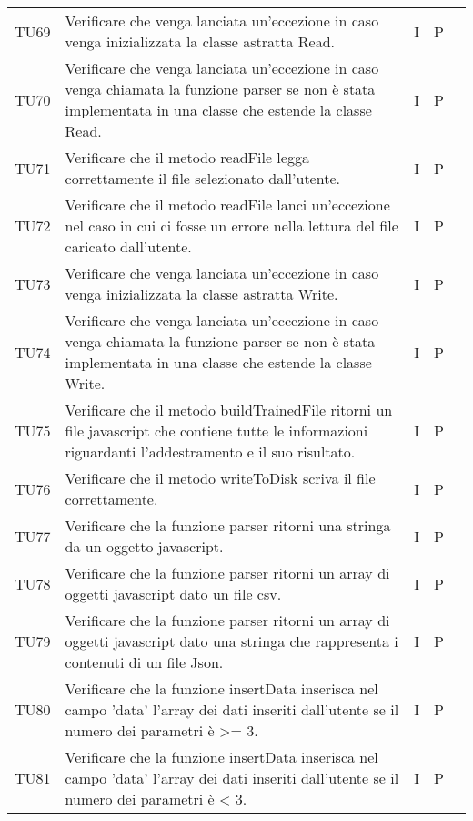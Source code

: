 \begin{longtable} {
		>{}p{15mm} 
		>{}p{79.5mm}
		>{}p{15mm} 
		>{}p{15mm}
		>{}p{0mm}}
	TU69		& Verificare che venga lanciata un'eccezione in caso venga inizializzata la classe astratta  Read.& I & P &\TBstrut \\ [2mm]
	TU70		& Verificare che venga lanciata un'eccezione in caso venga chiamata la funzione parser se non è stata implementata in una classe che estende la classe Read.& I & P &\TBstrut \\ [2mm]
	TU71		& Verificare che il metodo readFile legga correttamente il file selezionato dall'utente.& I & P &\TBstrut \\ [2mm]
	TU72		& Verificare che il metodo readFile lanci un'eccezione nel caso in cui ci fosse un errore nella lettura del file caricato dall'utente.& I & P &\TBstrut \\ [2mm]
	TU73		& Verificare che venga lanciata un'eccezione in caso venga inizializzata la classe astratta  Write.& I & P &\TBstrut \\ [2mm]
	TU74		& Verificare che venga lanciata un'eccezione in caso venga chiamata la funzione parser se non è stata implementata in una classe che estende la classe Write.& I & P &\TBstrut \\ [2mm]
	TU75		& Verificare che il metodo buildTrainedFile ritorni un file javascript che contiene tutte le informazioni riguardanti l'addestramento e il suo risultato.& I & P &\TBstrut \\ [2mm]
	TU76		& Verificare che il metodo writeToDisk scriva il file correttamente.& I & P &\TBstrut \\ [2mm]
	TU77		& Verificare che la funzione parser ritorni una stringa da un oggetto javascript.& I & P &\TBstrut \\ [2mm]
	TU78		& Verificare che la funzione parser ritorni un array di oggetti javascript dato un file csv.& I & P &\TBstrut \\ [2mm]
	TU79		& Verificare che la funzione parser ritorni un array di oggetti javascript dato una stringa che rappresenta i contenuti di un file Json.& I & P &\TBstrut \\ [2mm]
	TU80		& Verificare che la funzione insertData inserisca nel campo 'data' l'array dei dati inseriti dall'utente se il numero dei parametri è >= 3.& I & P &\TBstrut \\ [2mm]
	TU81		& Verificare che la funzione insertData inserisca nel campo 'data' l'array dei dati inseriti dall'utente se il numero dei parametri è < 3.& I & P &\TBstrut \\ [2mm]

\end{longtable}
